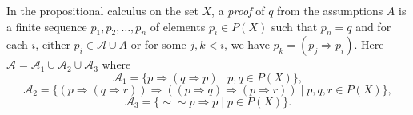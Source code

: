 In the propositional calculus on the set $X$, a \emph{proof} of $q$ from the assumptions $A$ is a finite sequence $p_1, p_2, \ldots, p_n$ of elements $p_i \in P(X)$ such that $p_n = q$ and for each $i$, either $p_i \in \mathcal{A} \cup A$ or for some $j, k < i$, we have $p_k = (p_j \Rightarrow p_i)$. Here $\mathcal{A} = \mathcal{A}_1 \cup \mathcal{A}_2 \cup \mathcal{A}_3$ where
$$\mathcal{A}_1 = \{p \Rightarrow (q \Rightarrow p) \mid p, q \in P(X)\},$$
$$\mathcal{A}_2 = \{(p \Rightarrow (q \Rightarrow r)) \Rightarrow ((p \Rightarrow q) \Rightarrow (p \Rightarrow r)) \mid p, q, r \in P(X)\},$$
$$\mathcal{A}_3 = \{\sim\sim p \Rightarrow p \mid p \in P(X)\}.$$
